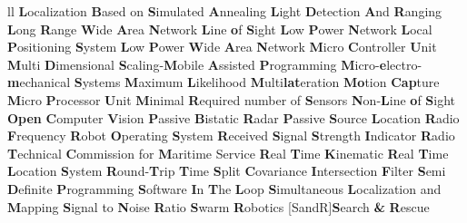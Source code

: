 \begin{abbreviations}{ll}
    		{\textbf{L}ocalization \textbf{B}ased on \textbf{S}imulated \textbf{A}nnealing}
    		{\textbf{L}ight \textbf{D}etection \textbf{A}nd \textbf{R}anging}
    	{\textbf{L}ong \textbf{R}ange \textbf{W}ide \textbf{A}rea \textbf{N}etwork}
    		{\textbf{L}ine   \textbf{o}f \textbf{S}ight}
    		{\textbf{L}ow \textbf{P}ower \textbf{N}etwork}
    		{\textbf{L}ocal \textbf{P}ositioning \textbf{S}ystem}
    		{\textbf{L}ow \textbf{P}ower \textbf{W}ide \textbf{A}rea \textbf{N}etwork}
    		{\textbf{M}icro \textbf{C}ontroller \textbf{U}nit}
    	{\textbf{M}ulti \textbf{D}imensional \textbf{S}caling-\textbf{M}obile \textbf{A}ssisted \textbf{P}rogramming}
    		{\textbf{M}icro-\textbf{e}lectro-\textbf{m}echanical \textbf{S}ystems}
    			{\textbf{M}aximum \textbf{L}ikelihood}
    		{\textbf{M}ulti\textbf{lat}eration}
    		{\textbf{Mo}tion \textbf{Cap}ture}
    		{\textbf{M}icro \textbf{P}rocessor \textbf{U}nit}
    		{\textbf{M}inimal \textbf{R}equired number of \textbf{S}ensors}
    		{\textbf{N}on-\textbf{L}ine \textbf{o}f \textbf{S}ight}
    		{\textbf{Open} \textbf{C}omputer \textbf{V}ision}
    		{\textbf{P}assive \textbf{B}istatic \textbf{R}adar}
    		{\textbf{P}assive \textbf{S}ource \textbf{L}ocation}
    	   		{\textbf{R}adio \textbf{F}requency}
    		{\textbf{R}obot \textbf{O}perating \textbf{S}ystem}
    		{\textbf{R}eceived \textbf{S}ignal \textbf{S}trength \textbf{I}ndicator}
    		{\textbf{R}adio \textbf{T}echnical \textbf{C}ommission for \textbf{M}aritime Service}
    		{\textbf{R}eal \textbf{T}ime \textbf{K}inematic}
    		{\textbf{R}eal \textbf{T}ime \textbf{L}ocation \textbf{S}ystem}
    		{\textbf{R}ound-\textbf{T}rip \textbf{T}ime}
    		{\textbf{S}plit \textbf{C}ovariance \textbf{I}ntersection \textbf{F}ilter}
    		{\textbf{S}emi \textbf{D}efinite \textbf{P}rogramming}
    		{\textbf{S}oftware \textbf{I}n \textbf{T}he \textbf{L}oop}
    		{\textbf{S}imultaneous \textbf{L}ocalization and \textbf{M}apping}
    		{\textbf{S}ignal to \textbf{N}oise \textbf{R}atio}
    			{\textbf{S}warm \textbf{R}obotics}
    [SandR]{\textbf{S}earch \textbf{\&} \textbf{R}escue}

\end{abbreviations}
